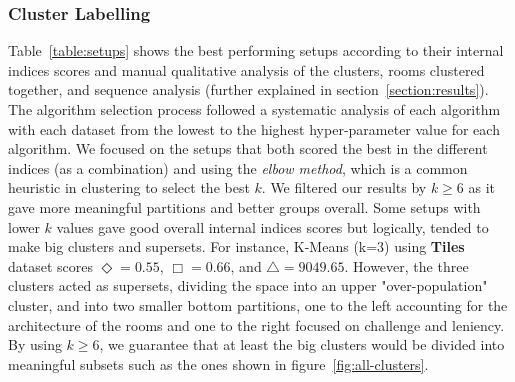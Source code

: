 \subsubsection{Cluster Labelling}


Table~\ref{table:setups} shows the best performing setups according to their internal indices scores and manual qualitative analysis of the clusters, rooms clustered together, and sequence analysis (further explained in section~\ref{section:results}). The algorithm selection process followed a systematic analysis of each algorithm with each dataset from the lowest to the highest hyper-parameter value for each algorithm. We focused on the setups that both scored the best in the different indices (as a combination) and using the \textit{elbow method}, which is a common heuristic in clustering to select the best $k$. We filtered our results by $k\ge6$ as it  gave more meaningful partitions and better groups overall. Some setups with lower $k$ values gave good overall internal indices scores but logically, tended to make big clusters and supersets. For instance, K-Means (k=3) using \textbf{Tiles} dataset scores $\Diamond = 0.55$, $\Box = 0.66$, and $\bigtriangleup = 9049.65$. However, the three clusters acted as supersets, dividing the space into an upper "over-population" cluster, and into two smaller bottom partitions, one to the left accounting for the architecture of the rooms and one to the right focused on challenge and leniency. By using $k\ge6$, we guarantee that at least the big clusters would be divided into meaningful subsets such as the ones shown in figure~\ref{fig:all-clusters}. 



